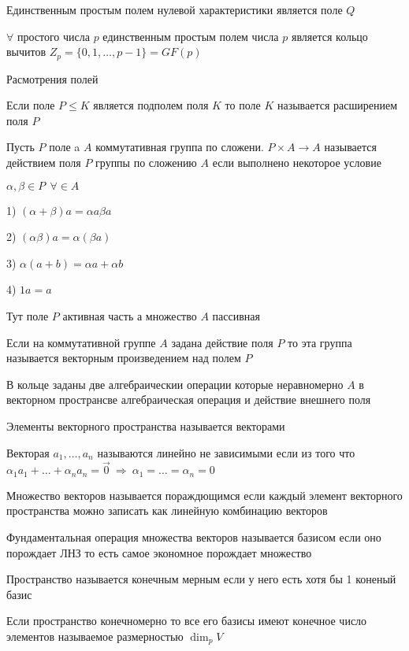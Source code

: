 \begin{theorem}
  Единственным простым полем нулевой характеристики является поле $Q$
\end{theorem}

\begin{theorem}
  $\forall$ простого числа $p$ единственным простым полем числа $p$ является
  кольцо вычитов $Z_p = \{0,1, \ldots, p-1\} = GF(p)$
\end{theorem}

Расмотрения полей

Если поле $P \le K$ является подполем поля $K$ то поле $K$ называется
расширением поля $P$

Пусть $P$ поле a $A$ коммутативная группа по сложени. $P \times A \to A$
называется действием поля $P$ группы по сложению $A$ если выполнено некоторое
условие

$\alpha, \beta \in P ~~ \forall \in A$

1) $(\alpha + \beta) a = \alpha a \beta a$

2) $(\alpha \beta)a = \alpha(\beta a)$

3) $\alpha(a+b) = \alpha a + \alpha b$

4) $1a = a$

Тут поле $P$ активная часть а множество $A$ пассивная

Если на коммутативной группе $A$ задана действие поля $P$ то эта группа
называется векторным произведением над полем $P$

В кольце заданы две алгебраическии операции которые неравномерно $A$ в
векторном пространсве алгебраическая операция и действие внешнего поля

Элементы векторного пространства называется векторами

Векторая $a_1, \ldots, a_n$ называются линейно не зависимыми если из того
что $\alpha_1 a_1 + \ldots + \alpha_n a_n = \vec 0 ~ \Rightarrow ~
\alpha_1 = \ldots = \alpha_n = 0$

Множество векторов называется пораждющимся если каждый элемент векторного
пространства можно записать как линейную комбинацию векторов

Фундаментальная операция множества векторов называется базисом если оно
порождает ЛНЗ то есть самое экономное порождает множество

Пространство называется конечным мерным если у него есть хотя бы 1 коненый
базис

\begin{theorem}
  Если пространство конечномерно то все его базисы имеют конечное число
  элементов называемое размерностью $\dim_p V$
\end{theorem}

